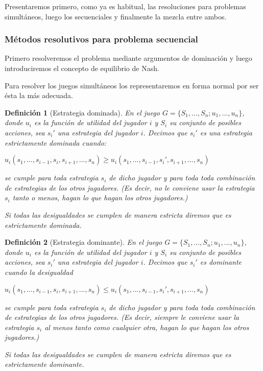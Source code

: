 \documentclass[a4paper]{report} %
\newtheorem{definicion}{Definición}[section]
\begin{document}
Presentaremos primero, como ya es habitual, las resoluciones para problemas simultáneos, luego los secuenciales y finalmente la mezcla entre ambos.

\subsubsection{Métodos resolutivos para problema secuencial}

Primero resolveremos el problema mediante argumentos de dominación y luego introduciremos el concepto de equilibrio de Nash.

Para resolver los juegos simultáneos los representaremos en forma normal por ser ésta la más adecuada.
\begin{definicion}[Estrategia dominada]
En el juego  $G=\lbrace S_1, ..., S_n; u_1, ..., u_n\rbrace$, donde $u_i$ es la función de utilidad del jugador $i$ y $S_i$ su conjunto de posibles acciones, sea $s_i'$ una estrategia del jugador $i$.
 Decimos que $s_i'$ es una estrategia estrictamente dominada cuando:



 $
 u_i(s_1, ..., s_{i-1},s_{i},s_{i+1},...,s_n) \geq u_i(s_1,..., s_{i-1},s_{i}',s_{i+1},...,s_n)
 $



se cumple para toda estrategia $s_i$ de dicho jugador y para toda toda combinación de
estrategias  de los otros jugadores.
(Es decir, no le conviene usar la estrategia $s_i$ tanto o menos, hagan lo que hagan los otros jugadores.)

 Si todas las desigualdades se cumplen de manera estricta diremos que es estrictamente dominada.

\end{definicion}

\begin{definicion}[Estrategia dominante]
En el juego $G=\lbrace S_1, ..., S_n; u_1, ..., u_n\rbrace$, donde $u_i$ es la función de utilidad del jugador $i$ y $S_i$ su conjunto de posibles acciones, sea $s_i'$ una estrategia del jugador $i$.
 Decimos que $s_i'$ es dominante cuando la desigualdad 



 $
 u_i(s_1, ..., s_{i-1},s_{i},s_{i+1},...,s_n) \leq u_i(s_1,..., s_{i-1},s_{i}',s_{i+1},...,s_n)
 $



se cumple para toda estrategia $s_i$ de dicho jugador y para toda toda combinación de
estrategias  de los otros jugadores.
(Es decir, siempre le conviene usar la estrategia $s_i$ al menos tanto como cualquier otra, hagan lo que hagan los otros jugadores.)

 Si todas las desigualdades se cumplen de manera estricta diremos que es estrictamente dominante.

\end{definicion}
\end{document}
